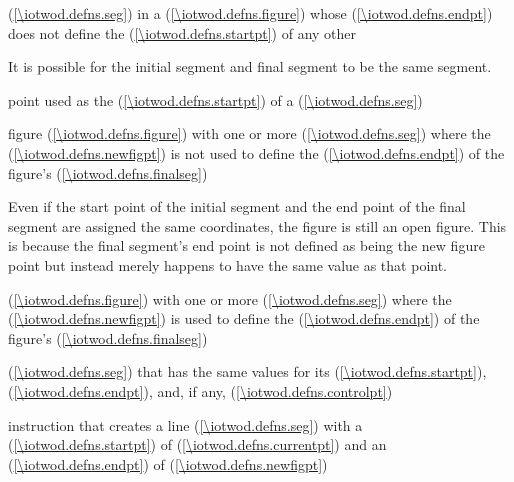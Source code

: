 %
 (\ref{\iotwod.defns.seg}) in a  (\ref{\iotwod.defns.figure}) whose  (\ref{\iotwod.defns.endpt}) does not define the  (\ref{\iotwod.defns.startpt}) of any other 
\begin{note}
It is possible for the initial segment and final segment to be the same segment.
\end{note}

%
point used as the  (\ref{\iotwod.defns.startpt}) of a  (\ref{\iotwod.defns.seg})

%
figure (\ref{\iotwod.defns.figure}) with one or more  (\ref{\iotwod.defns.seg}) where the  (\ref{\iotwod.defns.newfigpt}) is not used to define the  (\ref{\iotwod.defns.endpt}) of the figure's  (\ref{\iotwod.defns.finalseg})
\begin{note}
Even if the start point of the initial segment and the end point of the final segment are assigned the same coordinates, the figure is still an open figure. This is because the final segment's end point is not defined as being the new figure point but instead merely happens to have the same value as that point.
\end{note}

%
 (\ref{\iotwod.defns.figure}) with one or more  (\ref{\iotwod.defns.seg}) where the  (\ref{\iotwod.defns.newfigpt}) is used to define the  (\ref{\iotwod.defns.endpt}) of the figure's  (\ref{\iotwod.defns.finalseg})

%
 (\ref{\iotwod.defns.seg}) that has the same values for its  (\ref{\iotwod.defns.startpt}),  (\ref{\iotwod.defns.endpt}), and, if any,  (\ref{\iotwod.defns.controlpt})

%
 instruction that creates a line  (\ref{\iotwod.defns.seg}) with a  (\ref{\iotwod.defns.startpt}) of  (\ref{\iotwod.defns.currentpt}) and an  (\ref{\iotwod.defns.endpt}) of  (\ref{\iotwod.defns.newfigpt})

